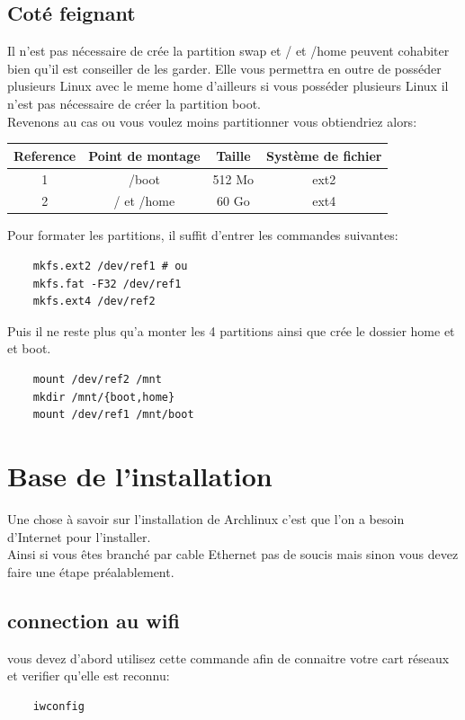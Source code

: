 \documentclass[a4paper]{book}
\begin{document}
  \section{Coté feignant}
  Il n'est pas nécessaire de crée la partition swap et / et /home peuvent
  cohabiter bien qu'il est conseiller de les garder. Elle vous permettra en outre
  de posséder plusieurs Linux avec le meme home d'ailleurs si vous posséder
  plusieurs Linux il n'est pas nécessaire de créer la partition boot.\\
  Revenons au cas ou vous voulez moins partitionner vous obtiendriez alors\@:\\
  \begin{tabular*}{\textwidth}{|c|c|c|c}
    Reference & Point de montage & Taille & Système de fichier\\
    \hline
    1 & /boot & 512 Mo & ext2 \\
    \hline
    2 & / et /home & 60 Go & ext4\\
  \end{tabular*}
  \newline
  Pour formater les partitions, il suffit d'entrer les commandes suivantes:\\
  \begin{lstlisting}
    mkfs.ext2 /dev/ref1 # ou
    mkfs.fat -F32 /dev/ref1 
    mkfs.ext4 /dev/ref2
  \end{lstlisting}
  Puis il ne reste plus qu'a monter les 4 partitions ainsi que crée le dossier
  home et et boot.\\
  \begin{lstlisting}
    mount /dev/ref2 /mnt
    mkdir /mnt/{boot,home}
    mount /dev/ref1 /mnt/boot
  \end{lstlisting}

  \chapter{Base de l'installation}
  Une chose à savoir sur l'installation de Archlinux c'est que l'on a besoin
  d'Internet pour l'installer.\\
  Ainsi si vous êtes branch\'e par cable Ethernet pas de soucis mais sinon vous
  devez faire une \'etape préalablement.
  \section{connection au wifi}
  vous devez d'abord utilisez cette commande afin de connaitre votre cart
  réseaux et verifier qu'elle est reconnu:\\
  \begin{lstlisting}
    iwconfig
  \end{lstlisting}
\end{document}
